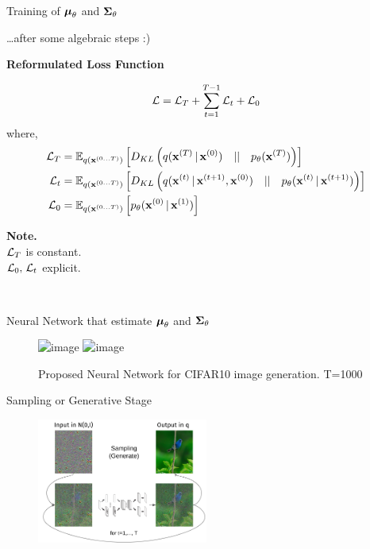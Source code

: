 \documentclass[aspectratio=169, 9pt]{beamer}
\theoremstyle{definition}
\begin{document}
\begin{frame}{Training of ${\boldsymbol{\mu}}_\theta$ and  ${\boldsymbol{\Sigma}}_\theta$}
  \begin{minipage}[t]{0.75\textwidth}
\ldots after some algebraic steps :)
  \begin{center}
    \bf
    Reformulated Loss Function
  \end{center}
  \[
    \mathcal{L} = \mathcal{L}_T + \sum_{t=1}^{T-1}\mathcal{L}_t + \mathcal{L}_0
  \]
  where, 
  \[
    \begin{aligned}
      \mathcal{L}_T &= \mathbb{E}_{q(\mathbf{x}^{(0\ldots T)})}\left[ D_{KL}\left(
      q(\mathbf{x}^{(T)}\,\vert\, \mathbf{x}^{(0)}) \quad||\quad p_\theta(\mathbf{x}^{(T)}) \right)
    \right] \\
     \mathcal{L}_t &= \mathbb{E}_{q(\mathbf{x}^{(0\ldots T)})}\left[ D_{KL}\left(
        q(\mathbf{x}^{(t)}\,\vert\, \mathbf{x}^{(t+1)},\mathbf{x}^{(0)}) \quad||\quad
      p_\theta(\mathbf{x}^{(t)}\,\vert\, \mathbf{x}^{(t+1)}) \right)
    \right]
    \\
    \mathcal{L}_0 &= \mathbb{E}_{q(\mathbf{x}^{(0\ldots T)})}\left[ p_\theta(\mathbf{x}^{(0)}\,\vert\, \mathbf{x}^{(1)}) \right]
  \end{aligned}
  \]
\end{minipage}\hfill%
\begin{minipage}[t]{0.20\textwidth}
  \vspace{4cm}
  \textbf{Note.}\\
  $\mathcal{L}_T$ is constant.\\
  $\mathcal{L}_0,\,\mathcal{L}_t$ explicit.\\
\end{minipage}\\
\end{frame}
\begin{frame}{Neural Network that estimate ${\boldsymbol{\mu}}_\theta$ and
  ${\boldsymbol{\Sigma}}_\theta$}
  \begin{figure}[h!]
    \centering
    \includegraphics<1>[width=0.45\textwidth]{./pic/diff_net_1.png}%
    \includegraphics<2>[width=0.45\textwidth]{./pic/diff_net_2.png}%
  \caption{Proposed Neural Network for CIFAR10 image generation. T=1000}
  \end{figure}
\end{frame}
\begin{frame}{Sampling or Generative Stage}
  \begin{figure}[h]
    \centering
    \includegraphics[width=0.5\textwidth]{./pic/sampling.png}
  \end{figure}
\end{frame}
\end{document}
